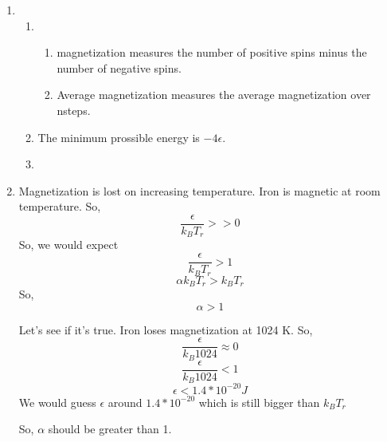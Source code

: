 \documentclass[letterpaper,12pt]{article}
\begin{document}
\begin{enumerate}
\begin{enumerate}
\end{enumerate}

\item 

\begin{enumerate}
\item 
\begin{enumerate}
\item
magnetization measures the number of positive spins minus the number of negative spins.

\item 
Average magnetization measures the average magnetization over nsteps.

\end{enumerate}
\item
 The minimum prossible energy is  $-4  \epsilon$.

 \item


\end{enumerate}

\item
Magnetization is lost on increasing temperature.
Iron is magnetic at room temperature. So,
\[\frac{\epsilon}{k_B T_r} >>0\]
So, we would expect 
\[\frac{\epsilon}{k_B T_r} > 1\]
\[\alpha k_B T_r >   k_B T_r\]
So, 
\[\alpha  >   1\]

Let's see if it's true. Iron loses magnetization at 1024 K.
So,
\[\frac{\epsilon}{k_B 1024} \approx 0\]
\[\frac{\epsilon}{k_B 1024} < 1\]
\[\epsilon  < 1.4 *10^{-20}J\]
We would guess $\epsilon$ around $1.4 *10^{-20}$ which is still bigger than $k_B T_r$

So, $\alpha$ should be greater than 1.
\end{enumerate}
\end{document}
